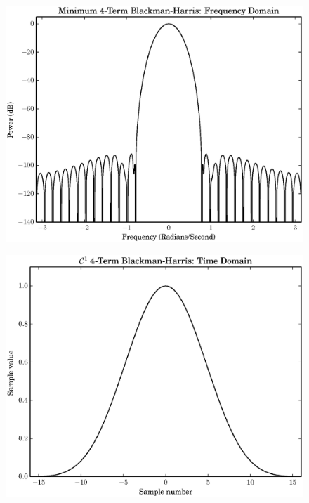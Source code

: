 \documentclass[letterpaper,12pt]{report}
\begin{document}
\begin{figure}
    \caption{}
    \includegraphics[width=\textwidth]{plots/min4_blackman_fd.eps}
\end{figure}

\begin{figure}
    \caption{}
    \includegraphics[width=\textwidth]{plots/c1_blackman_td.eps}
\end{figure}
\end{document}
